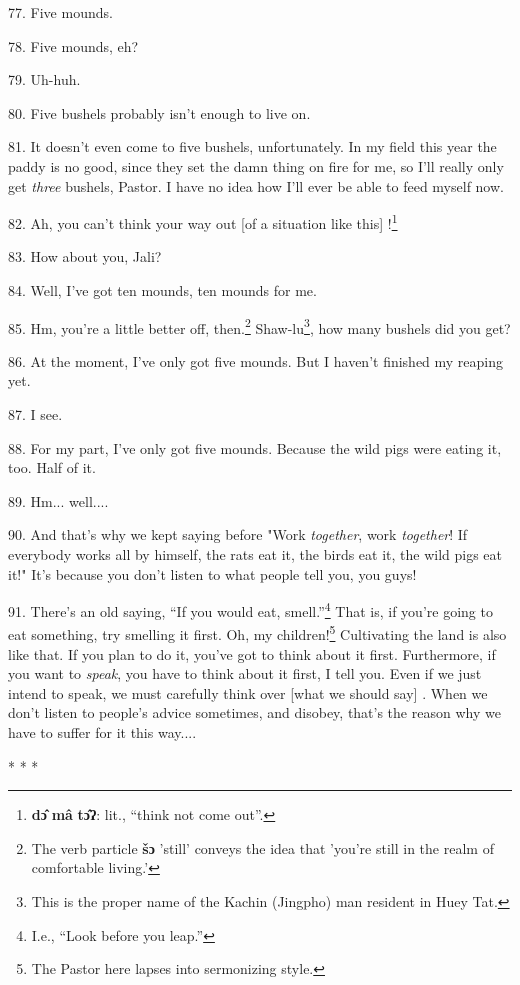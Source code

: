 77. Five mounds.

78. Five mounds, eh?

79. Uh-huh.

80. Five bushels probably isn't enough to live on.

81. It doesn't even come to five bushels, unfortunately. In my field this year
the paddy is no good, since they set the damn thing on fire for me, so I'll really
only get \textit{three} bushels, Pastor. I have no idea how I'll ever be able to
feed myself now.

82. Ah, you can't think your way out [of a situation like this] !\footnote{\textbf{dɔ̂} \textbf{mâ} \textbf{tɔ̂ʔ}: lit., ``think not come out''.}

83. How about you, Jali?

84. Well, I've got ten mounds, ten mounds for me.

85. Hm, you're a little better off, then.\footnote{The verb particle \textbf{šɔ} 'still' conveys the idea that 'you're still in the realm of comfortable living.'} Shaw-lu\footnote{This is the proper name of the Kachin (Jingpho) man resident in Huey Tat.}, how many bushels
did you get?

86. At the moment, I've only got five mounds. But I haven't finished my reaping
yet.

87. I see.

88. For my part, I've only got five mounds. Because the wild pigs were eating it,
too. Half of it.

89. Hm... well....

90. And that's why we kept saying before "Work\textit{ together}, work
\textit{together}! If everybody works all by himself, the rats eat it, the birds
eat it, the wild pigs eat it!" It's because you don't listen to what people
tell you, you guys!

91. There's an old saying, ``If you would eat, smell.''\footnote{I.e., ``Look before you leap.''} That
is, if you're going to eat something, try smelling it first. Oh, my children!\footnote{The Pastor here lapses into sermonizing style.}
Cultivating the land is also like that. If you plan to do it, you've got to think
about it first. Furthermore, if you want to \textit{speak}, you have to think about
it first, I tell you. Even if we just intend to speak, we must carefully think
over [what we should say] . When we don't listen to people's advice sometimes,
and disobey, that's the reason why we have to suffer for it this way....

\begin{center}
* * *
\end{center}

